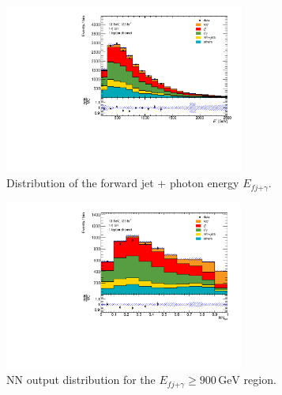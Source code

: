 \begin{figure}
    \centering
    \includegraphics[width=0.7\textwidth]{Plots/fjph_e.pdf}
    \caption{Distribution of the forward jet + photon energy $E_{fj\text{+}\gamma}$.}
    \label{fig:fjph_e}
\end{figure} 


\begin{figure}
    \centering
    \includegraphics[width=0.7\textwidth]{Plots/NN_out_mixfjphA900.pdf}
    \caption{NN output distribution for the $E_{fj\text{+}\gamma} \geq 900\,\si{\giga\electronvolt}$ region.}
    \label{fig:outputA900fjph_e}
\end{figure} 

